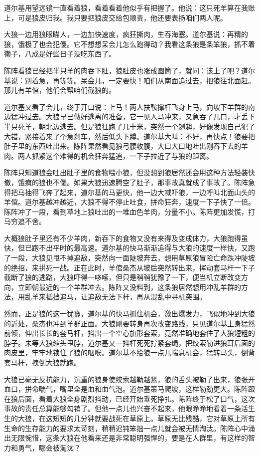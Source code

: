 \par 道尔基用望远镜一直看着狼，看着看着他似乎有把握了。他说：这只死羊算在我账上，可是狼皮归我。我只要把狼皮交给包顺贵，他还要表扬咱们两人呢。
\par 大狼一边用狼眼瞄人，一边加快速度，疯狂撕肉，生吞海塞。道尔基说：再精的狼，饿极了也会犯傻。它不想想呆会儿怎么跑得动？我看这条狼是条笨狼，抓不着獭子，八成是好些日子没吃东西了。
\par 陈阵看狼已经把半只羊的肉吞下肚，狼肚皮也涨成圆筒了，就问：该上了吧？道尔基说：别着急，再等等。呆会儿，一定要快！咱们从南面追过去，把狼往北面赶。那儿有羊倌，他们会帮咱们截狼的。
\par 道尔基又看了会儿，终于开口说：上马！两人扶鞍撑杆飞身上马，向坡下羊群的南边猛冲过去。大狼早已做好逃离的准备，它一见人马冲来，又急吞了几口，才丢下半只死羊，朝北边逃去。但是狼狂跑了几十米，突然一个趔趄，好像发现自己犯了大错，紧接着来了个急刹车，然后低头下蹲。道尔基大叫：不好，再快点！狼要把肚子里的东西吐出来。陈阵果然看见狼弓腰收腹，大口大口地吐出刚吞下去的羊肉。两人抓紧这个难得的机会狂奔猛追，一下子拉近了与狼的距离。
\par 陈阵只知道狼会吐出肚子里的食物喂小狼，但没想到狼居然还会用这种方法轻装快撤，饿疯的狼也不傻。如果大狼迅速腾空了肚子，那事故真就成了事故了。陈阵急得把马抽得飞奔了起来，道尔基的马更快，他一边大喊吓狼，一边呼叫北面山头的羊倌。道尔基越冲越近，大狼不得不停止吐食，拼命狂奔，速度一下子快了一倍。陈阵冲了一段，看到草地上狼吐出的一堆血色羊肉，分量不小。陈阵更加发慌，打马穷追不舍。
\par 大概狼肚子里还有不少羊肉，新吞下的食物又没有来得及变成体力，大狼跑得虽快，但已跑不出平时的最高速。道尔基的快马渐渐追得与大狼的速度一样快，又跑了一段，大狼见甩不掉追敌，突然向一面陡坡奔去，想用草原狼冒险亡命跌冲陡坡的绝招，来拼死一战。正在此时，羊倌桑杰从坡后突然转出来，挥动套马杆一下子截断了狼的逃路，大狼吓得一哆嗦，但只是稍稍犹豫了一下，便当机立断改变方向，立即朝最近的一个羊群冲去。陈阵又没料到，这条狼居然想用冲乱羊群的方法，用乱羊来抵挡追马，让追敌无法下杆，再从混乱中寻机突围。
\par 然而，正是狼的这一犹豫，道尔基的快马抓住机会，激出爆发力，飞似地冲到大狼的近处，桑杰也冲到羊群正面。大狼刚要转身再次改变路线，只见道尔基上身猛然前倾，伸出长长的套马杆，抖出一个空心旗形套索，竟然准确地套住了大狼短粗的脖子。未等大狼缩头甩脖，道尔基又一抖杆死死拧紧套绳，把绞索勒进狼耳后面的肉皮里，牢牢地锁住了狼的咽喉。道尔基不给狼一点儿喘息机会，猛转马头，倒背套马杆，拽倒大狼就跑。
\par 大狼已毫无反抗能力，沉重的狼身使绞索越勒越紧，狼的舌头被勒了出来，狼张开血口，拼命喘气，嘴里全是血和血气泡。道尔基策马爬坡，这样勒劲更大。陈阵跟在狼后面，看着大狼全身剧烈抖动，已经开始垂死挣扎。陈阵终于松了口气，这次事故的责任总算能够勾销了。但他一点儿也兴奋不起来，他眼睁睁地看着一条活生生的大狼，在这短短的几分钟就要战死在草原上。草原无比残酷，它对草原上所有生命的生存能力的要求太苛刻，稍稍迟钝笨拙一点儿就会被无情淘汰。陈阵心中涌出无限惋惜，这条大狼在他看来还是非常聪明强悍的，要是在人群里，有这样的智力和勇气，哪会被淘汰？
